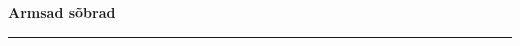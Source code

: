 \documentclass[10pt]{book}
\begin{document}
{
  \samepage
  \raggedbottom
  \raggedright
  \sloppy


  \vspace{0.2in}

  \noindent\begin{minipage}{.1\textwidth}
    \hfill\vspace{0.1in}
  \end{minipage}%
  \noindent\begin{minipage}{.8\textwidth}
    \centering
    \bfseries
    \large Armsad s\~obrad
  \end{minipage}%
  \noindent\begin{minipage}{.1\textwidth}
      \hfill\vspace{0.1in}
  \end{minipage}

  \nopagebreak[4]
  \vspace{0.1in}
  \nopagebreak[4]
  \hrule height 0.05ex
  \nopagebreak[4]
  \vspace{-0.05in}




}
\end{document}
